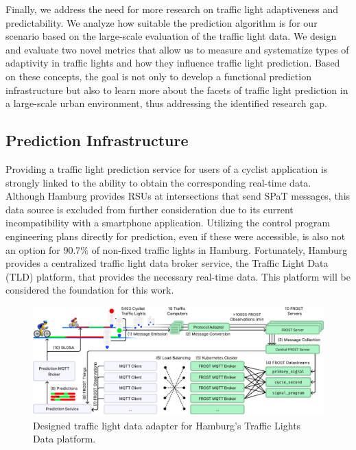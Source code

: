 Finally, we address the need for more research on traffic light adaptiveness and predictability. We analyze how suitable the prediction algorithm is for our scenario based on the large-scale evaluation of the traffic light data. We design and evaluate two novel metrics that allow us to measure and systematize types of adaptivity in traffic lights and how they influence traffic light prediction. Based on these concepts, the goal is not only to develop a functional prediction infrastructure but also to learn more about the facets of traffic light prediction in a large-scale urban environment, thus addressing the identified research gap.

\subsection{Prediction Infrastructure}

Providing a traffic light prediction service for users of a cyclist application is strongly linked to the ability to obtain the corresponding real-time data. Although Hamburg provides RSUs at intersections that send SPaT messages, this data source is excluded from further consideration due to its current incompatibility with a smartphone application. Utilizing the control program engineering plans directly for prediction, even if these were accessible, is also not an option for 90.7\% of non-fixed traffic lights in Hamburg. Fortunately, Hamburg provides a centralized traffic light data broker service, the Traffic Light Data (TLD) platform, that provides the necessary real-time data. This platform will be considered the foundation for this work.

\begin{figure}[t]
\centering
\includegraphics[width=\linewidth]{images/traffic-light-data-infrastructure.pdf}
\caption{Designed traffic light data adapter for Hamburg's Traffic Lights Data platform.}
\label{fig:traffic-light-data-infrastructure}
\end{figure}

